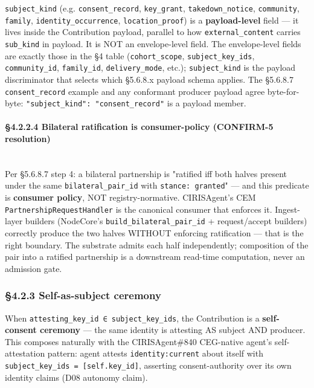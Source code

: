 \documentclass[11pt]{article}
\begin{document}
\texttt{subject\_kind} (e.g. \texttt{consent\_record}, \texttt{key\_grant}, \texttt{takedown\_notice}, \texttt{community}, \texttt{family}, \texttt{identity\_occurrence}, \texttt{location\_proof}) is a \textbf{payload-level} field — it lives inside the Contribution payload, parallel to how \texttt{external\_content} carries \texttt{sub\_kind} in payload. It is NOT an envelope-level field. The envelope-level fields are exactly those in the §4 table (\texttt{cohort\_scope}, \texttt{subject\_key\_ids}, \texttt{community\_id}, \texttt{family\_id}, \texttt{delivery\_mode}, etc.); \texttt{subject\_kind} is the payload discriminator that selects which §5.6.8.x payload schema applies. The §5.6.8.7 \texttt{consent\_record} example and any conformant producer payload agree byte-for-byte: \texttt{"subject\_kind": "consent\_record"} is a payload member.


\paragraph{§4.2.2.4 Bilateral ratification is consumer-policy (CONFIRM-5 resolution)}\mbox{}\\


Per §5.6.8.7 step 4: a bilateral partnership is "ratified iff both halves present under the same \texttt{bilateral\_pair\_id} with \texttt{stance: granted}" — and this predicate is \textbf{consumer policy}, NOT registry-normative. CIRISAgent's CEM \texttt{PartnershipRequestHandler} is the canonical consumer that enforces it. Ingest-layer builders (NodeCore's \texttt{build\_bilateral\_pair\_id} + request/accept builders) correctly produce the two halves WITHOUT enforcing ratification — that is the right boundary. The substrate admits each half independently; composition of the pair into a ratified partnership is a downstream read-time computation, never an admission gate.


\subsubsection*{§4.2.3 Self-as-subject ceremony}


When \texttt{attesting\_key\_id ∈ subject\_key\_ids}, the Contribution is a \textbf{self-consent ceremony} — the same identity is attesting AS subject AND producer. This composes naturally with the CIRISAgent\#840 CEG-native agent's self-attestation pattern: agent attests \texttt{identity:current} about itself with \texttt{subject\_key\_ids = [self.key\_id]}, asserting consent-authority over its own identity claims (D08 autonomy claim).
\end{document}
